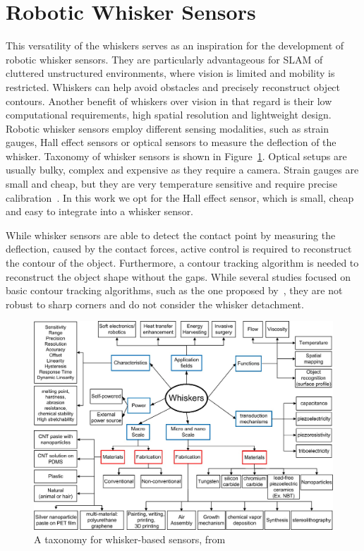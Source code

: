 \section{Robotic Whisker Sensors}

This versatility of the whiskers serves as an inspiration for the development of robotic whisker sensors.
They are particularly advantageous for SLAM of cluttered unstructured environments, where vision is limited and mobility is restricted.
Whiskers can help avoid obstacles and precisely reconstruct object contours.
Another benefit of whiskers over vision in that regard is their low computational requirements, high spatial resolution and lightweight design.
Robotic whisker sensors employ different sensing modalities, such as strain gauges, Hall effect sensors or optical sensors to measure the deflection of the whisker.
Taxonomy of whisker sensors is shown in Figure~\ref{fig:taxonomy}.
Optical setups are usually bulky, complex and expensive as they require a camera.
Strain gauges are small and cheap, but they are very temperature sensitive and require precise calibration~\cite{s19214713}.
In this work we opt for the Hall effect sensor, which is small, cheap and easy to integrate into a whisker sensor.

While whisker sensors are able to detect the contact point by measuring the deflection, caused by the contact forces, active control is required to reconstruct the contour of the object.
Furthermore, a contour tracking algorithm is needed to reconstruct the object shape without the gaps.
While several studies focused on basic contour tracking algorithms, such as the one proposed by~\cite{lin2022whiskerinspiredtactilesensingcontact}, they are not robust to sharp corners and do not consider the whisker detachment.

\begin{figure}[htb]
    \centering
    \includegraphics[width=0.65\textheight]{figures/taxonomy}
    \caption{A taxonomy for whisker-based sensors, from \cite{s22072705}}
    \label{fig:taxonomy}
\end{figure}


